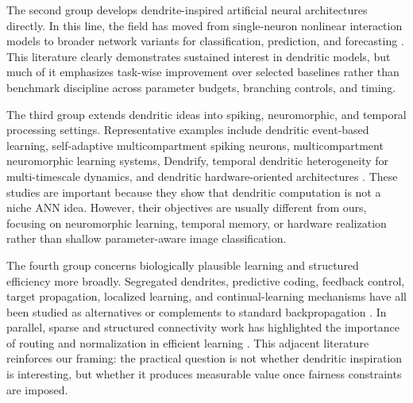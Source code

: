 \documentclass[preprint,12pt]{elsarticle}
\begin{document}
The second group develops dendrite-inspired artificial neural architectures directly. In this line, the field has moved from single-neuron nonlinear interaction models \cite{todo2014unsupervised,gao2019dendritic,qian2019mr2dnm,wang2020adaptive,wang2020median} to broader network variants for classification, prediction, and forecasting \cite{tang2021aisdnm,ji2021wind,jia2022verification,song2022logic,egrioglu2022recurrent,yilmaz2023robust,tomov2023madnn,ozkirimli2023bootstrapped,yuan2023pm25,tang2024dnn,egrioglu2024deepdann,li2024alternating,liu2024capturecorr,gao2023complex}. This literature clearly demonstrates sustained interest in dendritic models, but much of it emphasizes task-wise improvement over selected baselines rather than benchmark discipline across parameter budgets, branching controls, and timing.

The third group extends dendritic ideas into spiking, neuromorphic, and temporal processing settings. Representative examples include dendritic event-based learning, self-adaptive multicompartment spiking neurons, multicompartment neuromorphic learning systems, Dendrify, temporal dendritic heterogeneity for multi-timescale dynamics, and dendritic hardware-oriented architectures \cite{yang2021event,yang2022sam,gao2022multicompartment,pagkalos2023dendrify,zheng2024temporal,dagostino2024denram,baek2024silent,liu2024graphene,cardwell2025leveraging,malakasis2023turnover}. These studies are important because they show that dendritic computation is not a niche ANN idea. However, their objectives are usually different from ours, focusing on neuromorphic learning, temporal memory, or hardware realization rather than shallow parameter-aware image classification.

The fourth group concerns biologically plausible learning and structured efficiency more broadly. Segregated dendrites, predictive coding, feedback control, target propagation, localized learning, and continual-learning mechanisms have all been studied as alternatives or complements to standard backpropagation \cite{guerguiev2017segregated,lansdell2019credit,kunin2020tworoutes,millidge2020relaxing,meulemans2021deepfeedback,dalm2021targetprop,chen2022creditnet,tang2023predictive,millidge2024temporal,lv2025localized,sarfraz2023continual,mishra2021continual}. In parallel, sparse and structured connectivity work has highlighted the importance of routing and normalization in efficient learning \cite{bird2021dendriticnorm,cheng2018compression,shazeer2017moe,frankle2019lottery,drix2018sparsecoding,fruengel2025sparseconnectivity,shaier2024moreexperts}. This adjacent literature reinforces our framing: the practical question is not whether dendritic inspiration is interesting, but whether it produces measurable value once fairness constraints are imposed.
\end{document}
